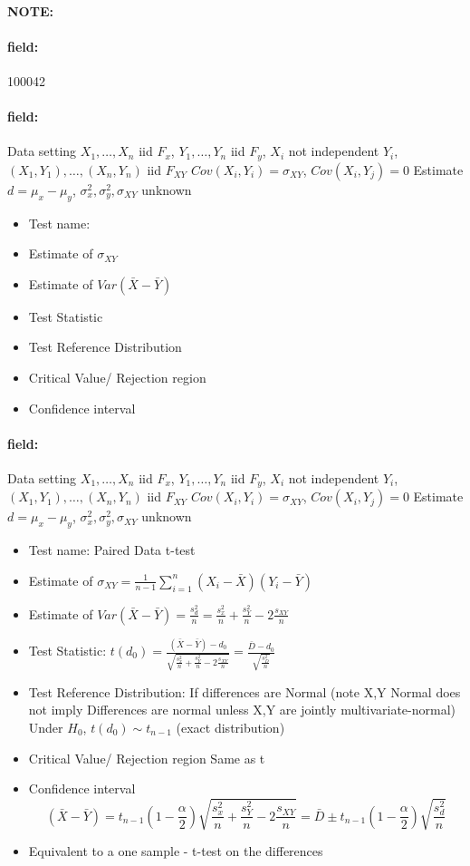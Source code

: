 \documentclass[12pt]{article}
\newenvironment{note}{\paragraph{NOTE:}}{}
\newenvironment{field}{\paragraph{field:}}{}
\begin{document}
\begin{note} \begin{field} \tiny 100042 \end{field}
 \begin{field}
  Data setting $X_1, \ldots , X_n$ iid $F_x$, $Y_1, \ldots, Y_n$ iid $F_y$, $X_i$ not independent $Y_i$, $(X_1, Y_1), \ldots , (X_n,Y_n)$ iid $F_{XY}$ $Cov(X_i,Y_i) = \sigma_{XY}$, $Cov(X_i,Y_j) = 0$ Estimate $d = \mu_x - \mu_y$, $\sigma_x^2, \sigma_y^2, \sigma_{XY}$ unknown
  \begin{itemize}
   \item Test name:
   \item Estimate of $\sigma_{XY}$
   \item Estimate of $Var(\bar{X} - \bar{Y})$
   \item Test Statistic
   \item Test Reference Distribution
   \item Critical Value/ Rejection region
   \item Confidence interval
  \end{itemize}
 \end{field}
 \begin{field}
  Data setting $X_1, \ldots , X_n$ iid $F_x$, $Y_1, \ldots, Y_n$ iid $F_y$, $X_i$ not independent $Y_i$, $(X_1, Y_1), \ldots , (X_n,Y_n)$ iid $F_{XY}$ $Cov(X_i,Y_i) = \sigma_{XY}$, $Cov(X_i,Y_j) = 0$ Estimate $d = \mu_x - \mu_y$, $\sigma_x^2, \sigma_y^2, \sigma_{XY}$ unknown
  \begin{itemize}
   \item Test name: Paired Data t-test
   \item Estimate of $\sigma_{XY} = \frac{1}{n-1} \sum_{i=1}^n (X_i - \bar{X})(Y_i - \bar{Y})$
   \item Estimate of $Var(\bar{X} - \bar{Y}) = \frac{s_d^2}{n} = \frac{s_x^2}{n} + \frac{s_Y^2}{n} - 2 \frac{s_{XY}}{n}$
   \item Test Statistic: $t(d_0) = \frac{(\bar{X} - \bar{Y}) - d_0}{\sqrt{\frac{s_x^2}{n} + \frac{s_Y^2}{n} - 2 \frac{s_{XY}}{n}}} = \frac{\bar{D} - d_0}{\sqrt{\frac{s_D^2}{n}}}$
   \item Test Reference Distribution: If differences are Normal (note X,Y Normal does not imply Differences are normal unless X,Y are jointly multivariate-normal) Under $H_0$, $t(d_0) \sim t_{n-1}$ (exact distribution)
   \item Critical Value/ Rejection region Same as t
   \item Confidence interval
         $$ (\bar{X} - \bar{Y}) = t_{n-1}(1 - \frac{\alpha}{2})\sqrt{\frac{s_x^2}{n} + \frac{s_Y^2}{n} - 2 \frac{s_{XY}}{n}} = \bar{D} \pm  t_{n-1}(1 - \frac{\alpha}{2}) \sqrt{\frac{s_d^2}{n}}$$
   \item Equivalent to a one sample - t-test on the differences
  \end{itemize}
 \end{field}
\end{note}
\end{document}
